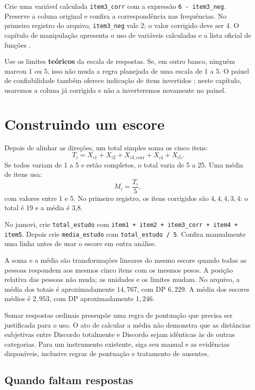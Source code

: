 Crie uma variável calculada \texttt{item3\_corr} com a expressão \texttt{6 - item3\_neg}. Preserve a coluna original e confira a correspondência nas frequências. No primeiro registro do arquivo, \texttt{item3\_neg} vale 2; o valor corrigido deve ser 4. O capítulo de manipulação apresenta o uso de variáveis calculadas e a lista oficial de funções \parencite{JamoviFuncoes}.

Use os limites \textbf{teóricos} da escala de respostas. Se, em outro banco, ninguém marcou 1 ou 5, isso não muda a regra planejada de uma escala de 1 a 5. O painel de confiabilidade também oferece indicação de itens invertidos \parencite{JamoviConfiabilidade}; neste capítulo, usaremos a coluna já corrigida e não a inverteremos novamente no painel.

\section{Construindo um escore}

Depois de alinhar as direções, um total simples soma os cinco itens:
\[
T_i=X_{i1}+X_{i2}+X_{i3,\mathrm{corr}}+X_{i4}+X_{i5}.
\]
Se todos variam de 1 a 5 e estão completos, o total varia de 5 a 25. Uma média de itens usa:
\[
M_i=\frac{T_i}{5},
\]
com valores entre 1 e 5. No primeiro registro, os itens corrigidos são $4,4,4,3,4$: o total é 19 e a média é 3,8.

No jamovi, crie \texttt{total\_estudo} com \texttt{item1 + item2 + item3\_corr + item4 + item5}. Depois crie \texttt{media\_estudo} com \texttt{total\_estudo / 5}. Confira manualmente uma linha antes de usar o escore em outra análise.

A soma e a média são transformações lineares do mesmo escore quando todas as pessoas respondem aos mesmos cinco itens com os mesmos pesos. A posição relativa das pessoas não muda; as unidades e os limites mudam. No arquivo, a média dos totais é aproximadamente $14{,}767$, com DP $6{,}229$. A média dos escores médios é $2{,}953$, com DP aproximadamente $1{,}246$.

Somar respostas ordinais pressupõe uma regra de pontuação que precisa ser justificada para o uso. O ato de calcular a média não demonstra que as distâncias subjetivas entre Discordo totalmente e Discordo sejam idênticas às de outras categorias. Para um instrumento existente, siga seu manual e as evidências disponíveis, inclusive regras de pontuação e tratamento de ausentes.

\subsection{Quando faltam respostas}

